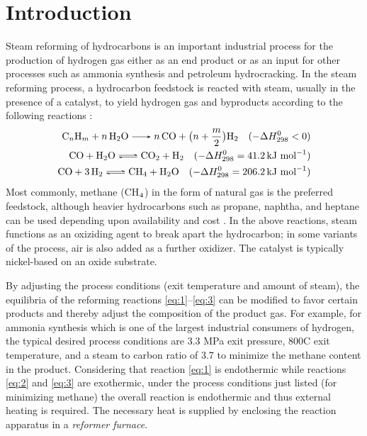 \chapter{Introduction} \label{ch:introduction}

Steam reforming of hydrocarbons is an important industrial process for the production of hydrogen gas either as an end product or as an input for other processes such as ammonia synthesis and petroleum hydrocracking. In the steam reforming process, a hydrocarbon feedstock is reacted with steam, usually in the presence of a catalyst, to yield hydrogen gas and byproducts according to the following reactions \cite{rostrup-nielsen_catalytic_1984}:
\begin{align}
\ce{C_{n}H_{m} + n H2O -> n CO + } \bigl(n + \frac{m}{2}\bigr) \ce{H2} \quad (-\Delta{}H^{0}_{298} < 0) \label{eq:1} \\
\ce{CO + H2O <=> CO2 + H2} \quad (-\Delta{}H^{0}_{298} = 41.2 \, \text{kJ mol}^{-1}) \label{eq:2} \\
\ce{CO + 3H2 <=> CH4 + H2O} \quad (-\Delta{}H^{0}_{298} = 206.2 \, \text{kJ mol}^{-1}) \label{eq:3}
\end{align}
Most commonly, methane (CH$_{\textnormal{4}}$) in the form of natural gas is the preferred feedstock, although heavier hydrocarbons such as propane, naphtha, and heptane can be used depending upon availability and cost \cite{rostrup-nielsen_catalytic_1984,haussinger_hydrogen_2000}. In the above reactions, steam functions as an oxiziding agent to break apart the hydrocarbon; in some variants of the process, air is also added as a further oxidizer. The catalyst is typically nickel-based on an oxide substrate.

By adjusting the process conditions (exit temperature and amount of steam), the equilibria of the reforming reactions \ref{eq:1}--\ref{eq:3} can be modified to favor certain products and thereby adjust the composition of the product gas. For example, for ammonia synthesis which is one of the largest industrial consumers of hydrogen, the typical desired process conditions are 3.3 MPa exit pressure, 800\textdegree{}C exit temperature, and a steam to carbon ratio of 3.7 \cite{rostrup-nielsen_catalytic_1984} to minimize the methane content in the product. Considering that reaction \ref{eq:1} is endothermic while reactions \ref{eq:2} and \ref{eq:3} are exothermic, under the process conditions just listed (for minimizing methane) the overall reaction is endothermic and thus external heating is required. The necessary heat is supplied by enclosing the reaction apparatus in a \emph{reformer furnace}.

